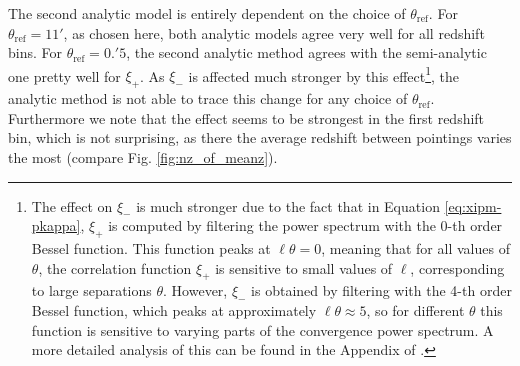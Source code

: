 \documentclass{aa}
\renewcommand{\rm}{\mathrm}
\begin{document}
The second analytic model is entirely dependent on the choice of $\theta_{\rm{ref}}$. For $\theta_{\rm{ref}}=11'$, as chosen here, both analytic models agree very well for all redshift bins. For $\theta_{\rm{ref}}=0.\!'5$, the second analytic method agrees with the semi-analytic one pretty well for $\xi_+$. As $\xi_-$ is affected much stronger by this effect\footnote{The effect on $\xi_-$ is much stronger due to the fact that in Equation \eqref{eq:xipm-pkappa}, $\xi_+$ is computed by filtering the power spectrum with the 0-th order Bessel function. This function peaks at $\ell\theta=0$, meaning that for all values of $\theta$, the correlation function $\xi_+$ is sensitive to small values of $\ell$, corresponding to large separations $\theta$. However, $\xi_-$ is obtained by filtering with the 4-th order Bessel function, which peaks at approximately $\ell\theta\approx 5$, so for different $\theta$ this function is sensitive to varying parts of the convergence power spectrum. A more detailed analysis of this can be found in the Appendix of \citet{2017MNRAS.471.4412K}.}, the analytic method is not able to trace this change for any choice of $\theta_{\rm{ref}}$. Furthermore we note that the effect seems to be strongest in the first redshift bin, which is not surprising, as there the average redshift between pointings varies the most (compare Fig. \ref{fig:nz_of_meanz}).
\end{document}
